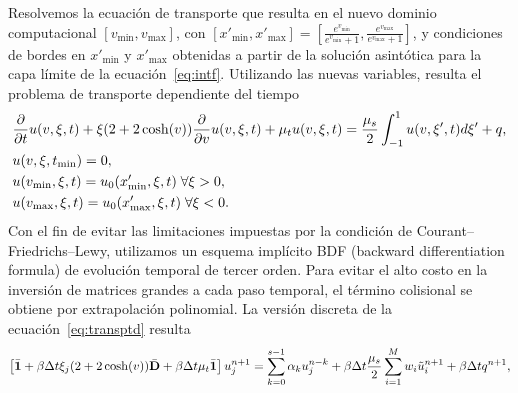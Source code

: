 Resolvemos la ecuación de transporte que resulta en el nuevo dominio computacional
$[v_{\text{min}},v_{\text{max}}]$, con 
$[x'_{\text{min}},x'_{\text{max}}]=[\frac{e^{v_{\text{min}}}}{e^{v_{\text{min}}}+1},
\frac{e^{v_{\text{max}}}}{e^{v_{\text{max}}}+1}]$, 
y condiciones de bordes en $x'_{\text{min}}$ y $x'_{\text{max}}$ 
obtenidas a partir de la solución asintótica para la capa límite 
de la ecuación~\eqref{eq:intf}. Utilizando las nuevas variables, 
resulta el problema de transporte dependiente del tiempo
\begin{equation}
\begin{split}
&\frac{\partial}{\partial t}u(v,\xi,t)+\xi(2+2\cosh(v)) \frac{\partial}{\partial v}u(v,\xi,t)+
\mu_tu(v,\xi,t)=\frac{\mu_s}{2} \int_{-1}^{1} u(v,\xi',t) d\xi'+q, \\
&u(v,\xi,t_{\text{min}})=0,\\
&u(v_{\text{min}},\xi,t)=u_{0}(x'_{\text{min}},\xi,t) \; \forall \xi>0,\\
&u(v_{\text{max}},\xi,t)=u_{0}(x'_{\text{max}},\xi,t) \; \forall \xi<0.
\end{split}
\label{eq:transptd}
\end{equation}
Con el fin de evitar las
limitaciones impuestas por la condición de Courant–Friedrichs–Lewy, utilizamos un 
esquema implícito BDF (backward differentiation formula) de evolución temporal de tercer orden. 
Para evitar el alto costo en la inversión de matrices grandes a 
cada paso temporal, el término 
colisional se obtiene por extrapolación polinomial. La versión discreta 
de la ecuación~\eqref{eq:transptd} resulta
\begin{equation}
\begin{aligned}
 \left[ \bar{\mathbf{1}} + \beta\Delta t\xi_j (2+2\cosh(v)) \bar{\mathbf{D}} + \beta\Delta t \mu_t \bar{\mathbf{1}} \right]  u^{n+1}_j  = 
\sum_{k=0}^{s-1}\alpha_k u_j^{n-k} + \beta\Delta t \frac{\mu_s}{2}
 \sum_{i=1}^{M} w_i \tilde{u}_i^{n+1} + \beta\Delta t q^{n+1},
\end{aligned}
\label{eq:transptd1disc}
\end{equation}
